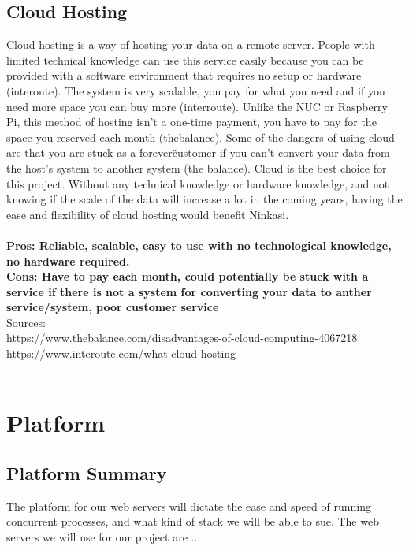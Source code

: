 \documentclass[draftclsnofoot,onecolumn,letterpaper,10pt,compsoc]{IEEEtran}
\begin{document}
	\subsection{Cloud Hosting}
        Cloud hosting is a way of hosting your data on a remote server.
				People with limited technical knowledge can use this service easily because you can be provided with a software environment that requires no setup or hardware (interoute).
				The system is very scalable, you pay for what you need and if you need more space you can buy more (interroute).
				Unlike the NUC or Raspberry Pi, this method of hosting isn't a one-time payment, you have to pay for the space you reserved each month (thebalance).
				Some of the dangers of using cloud are that you are stuck as a \"forever\" customer if you can't convert your data from the host's system to another system (the balance).
				Cloud is the best choice for this project.
				Without any technical knowledge or hardware knowledge, and not knowing if the scale of the data will increase a lot in the coming years, having the ease and flexibility of cloud hosting would benefit Ninkasi.
				\\ \\
				\textbf{Pros: Reliable, scalable, easy to use with no technological knowledge, no hardware required.}
				\\
				\textbf{Cons: Have to pay each month, could potentially be stuck with a service if there is not a system for converting your data to anther service/system, poor customer service}
				\\
    Sources: \\
        https://www.thebalance.com/disadvantages-of-cloud-computing-4067218 \\
				https://www.interoute.com/what-cloud-hosting \\ \\


\section{Platform}
\subsection{Platform Summary}
The platform for our web servers will dictate the ease and speed of running concurrent processes, and what kind of stack we will be able to sue.
The web servers we will use for our project are ...
\end{document}

